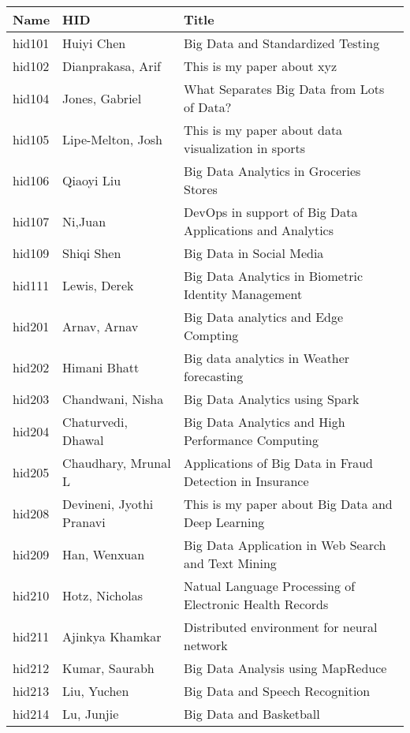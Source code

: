\documentclass[12pt]{book}
\begin{document}
\begin{footnotesize}
\begin{longtable}{|p{1cm}p{5cm}p{9cm}|}
\hline \textbf{Name} & \textbf{HID} & \textbf{Title} \\ \hline \hline

hid101 & Huiyi Chen & Big Data and Standardized Testing  \\
\hline
hid102 & Dianprakasa, Arif & This is my paper about xyz  \\
\hline
hid104 & Jones, Gabriel & What Separates Big Data from Lots of Data?  \\
\hline
hid105 & Lipe-Melton, Josh & This is my paper about data visualization in sports  \\
\hline
hid106 & Qiaoyi Liu & Big Data Analytics in Groceries Stores  \\
\hline
hid107 & Ni,Juan & DevOps in support of Big Data Applications and Analytics  \\
\hline
hid109 & Shiqi Shen & Big Data in Social Media  \\
\hline
hid111 & Lewis, Derek & Big Data Analytics in Biometric Identity Management  \\
\hline
hid201 & Arnav, Arnav & Big Data analytics and Edge Compting  \\
\hline
hid202 & Himani Bhatt & Big data analytics in Weather forecasting  \\
\hline
hid203 & Chandwani, Nisha & Big Data Analytics using Spark  \\
\hline
hid204 & Chaturvedi, Dhawal & Big Data Analytics and High Performance Computing  \\
\hline
hid205 & Chaudhary, Mrunal L & Applications of Big Data in Fraud Detection in Insurance  \\
\hline
hid208 & Devineni, Jyothi Pranavi & This is my paper about Big Data and Deep Learning  \\
\hline
hid209 & Han, Wenxuan & Big Data Application in Web Search and Text Mining  \\
\hline
hid210 & Hotz, Nicholas & Natual Language Processing of Electronic Health Records  \\
\hline
hid211 & Ajinkya Khamkar & Distributed environment for neural network  \\
\hline
hid212 & Kumar, Saurabh & Big Data Analysis using MapReduce  \\
\hline
hid213 & Liu, Yuchen & Big Data and Speech Recognition  \\
\hline
hid214 & Lu, Junjie & Big Data and Basketball  \\

\end{longtable}
\end{footnotesize}
\end{document}

